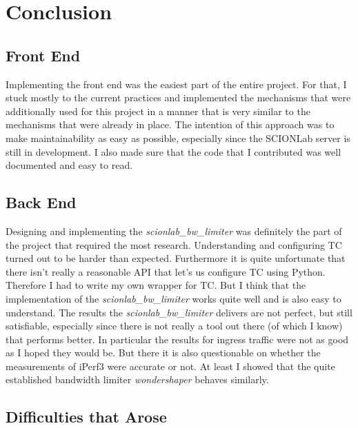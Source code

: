 \chapter{Conclusion}
\section{Front End}

Implementing the front end was the easiest part of the entire project. For that, I stuck mostly to the current practices and implemented the mechanisms that were additionally used for this project in a manner that is very similar to the mechanisms that were already in place. The intention of this approach was to make maintainability as easy as possible, especially since the \acs{SCIONLab} server is still in development. I also made sure that the code that I contributed was well documented and easy to read.

\section{Back End}

Designing and implementing the \textit{scionlab\_bw\_limiter} was definitely the part of the project that required the most research. Understanding and configuring \acs{TC} turned out to be harder than expected. Furthermore it is quite unfortunate that there isn't really a reasonable \acs{API} that let's us configure \acs{TC} using Python. Therefore I had to write my own wrapper for \acs{TC}. But I think that the implementation of the \textit{scionlab\_bw\_limiter} works quite well and is also easy to understand. The results the \textit{scionlab\_bw\_limiter} delivers are not perfect, but still satisfiable, especially since there is not really a tool out there (of which I know) that performs better. In particular the results for ingress traffic were not as good as I hoped they would be. But there it is also questionable on whether the measurements of iPerf3 were accurate or not. At least I showed that the quite established bandwidth limiter \textit{wondershaper} behaves similarly.

\section{Difficulties that Arose}

